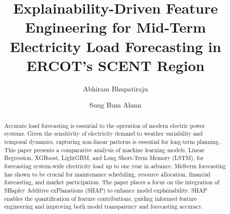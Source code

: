 \documentclass[final,numbered]{ifacconf}
\begin{document}
\begin{frontmatter}

\title{Explainability-Driven Feature Engineering for Mid-Term Electricity Load Forecasting in ERCOT's SCENT Region}


\author{Abhiram Bhupatiraju}
\address{Institute for Computing in Research}

\author{Sung Bum Ahmn}
\address{Electric Reliability Council of Texas, Taylor TX}

\begin{abstract}
Accurate load forecasting is essential to the operation of modern electric power systems. Given the sensitivity of electricity demand to weather variability and temporal dynamics, capturing non-linear patterns is essential for long-term planning. This paper presents a comparative analysis of machine learning models, Linear Regression, XGBoost, LightGBM, and Long Short-Term Memory (LSTM), for forecasting system-wide electricity load up to one year in advance. Midterm forecasting has shown to be crucial for maintenance scheduling, resource allocation, financial forecasting, and market participation. The paper places a focus on the integration of SHapley Additive exPlanations (SHAP) to enhance model explainability. SHAP enables the quantification of feature contributions, guiding informed feature engineering and improving both model transparency and forecasting accuracy.
\end{abstract}
\end{frontmatter}
\end{document}
